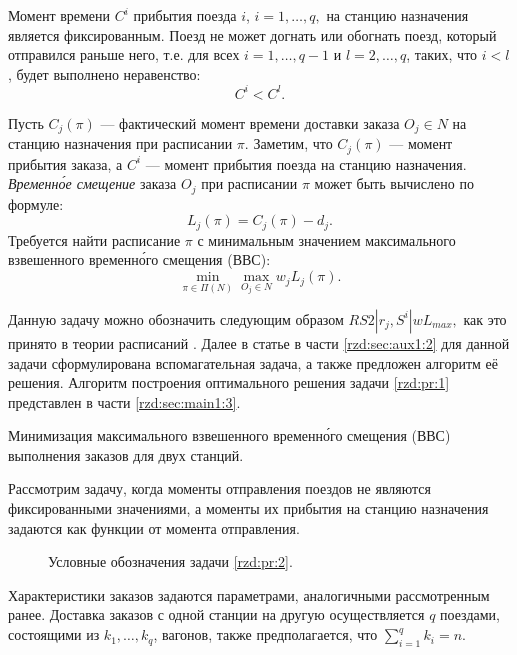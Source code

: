 Момент времени $C^i$ прибытия поезда $i$, $i=1, \dots, q,$ на станцию назначения является фиксированным.
Поезд не может догнать или обогнать поезд, который отправился раньше него, т.е. для всех $i=1, \dots, q-1$ и $l=2, \dots, q$, таких, что $i<l$, будет выполнено неравенство:
\begin{equation*}
C^i < C^l.
\end{equation*}

Пусть $C_j(\pi)$ --- фактический момент времени доставки заказа $O_j \in N$ на станцию назначения при расписании $\pi$. Заметим, что $C_j(\pi)$ --- момент прибытия заказа, а $C^i$ --- момент прибытия поезда на станцию назначения. \textit{Временн\'{о}е смещение} заказа $O_j$ при расписании $\pi$ может быть вычислено по формуле:
$$L_j(\pi) = C_j(\pi) - d_j.$$
Требуется найти расписание $\pi$ с минимальным значением максимального взвешенного временн\'{о}го смещения (ВВС):
\begin{equation*}
  \min\limits_{\pi \in \Pi(N)}\max\limits_{O_j\in N}w_j L_j(\pi).
\end{equation*}

Данную задачу можно обозначить следующим образом $RS2|r_j, S^i|wL_{max},$ как это принято в теории расписаний \cite{GLLR:79}. Далее в статье в части \ref{rzd:sec:aux1:2} для данной задачи сформулирована вспомагательная задача, а также предложен алгоритм её решения. Алгоритм построения оптимального решения задачи \ref{rzd:pr:1} представлен в части \ref{rzd:sec:main1:3}.\\

\begin{problem}{Минимизация максимального взвешенного временн\'{о}го смещения (ВВС) выполнения заказов для двух станций.}\label{rzd:pr:2}
\end{problem}

Рассмотрим задачу, когда моменты отправления поездов не являются фиксированными значениями, а моменты их прибытия на станцию назначения задаются как функции от момента отправления.

\begin{figure}[h!]
\caption{Условные обозначения задачи \ref{rzd:pr:2}.}
\label{rzd:pic:1}
\end{figure}

Характеристики заказов задаются параметрами, аналогичными рассмотренным ранее. Доставка заказов с одной станции на другую осуществляется $q$ поездами, состоящими из $k_1, \dots, k_q $, вагонов, также предполагается, что $\sum\limits_{i=1}^q k_i = n$.

